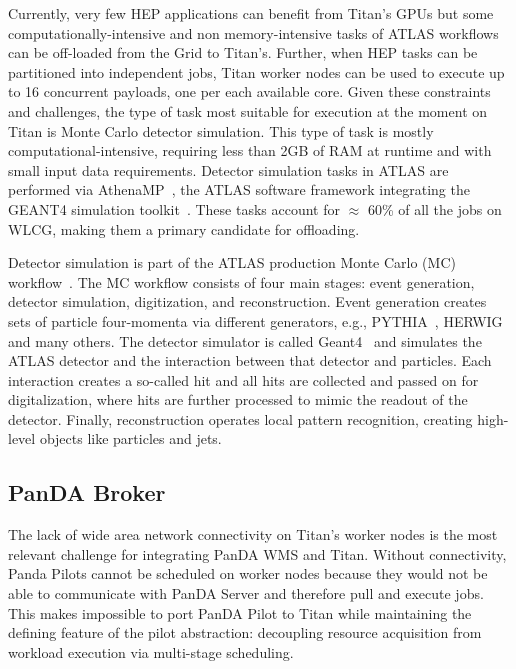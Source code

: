 Currently, very few HEP applications can benefit from Titan's GPUs but some
computationally-intensive and non memory-intensive tasks of ATLAS workflows
can be off-loaded from the Grid to Titan's. Further, when HEP tasks can be
partitioned into independent jobs, Titan worker nodes can be used to execute
up to 16 concurrent payloads, one per each available core. Given these
constraints and challenges, the type of task most suitable for execution at
the moment on Titan is Monte Carlo detector simulation. This type of task is
mostly computational-intensive, requiring less than 2GB of RAM at runtime and
with small input data requirements. Detector simulation tasks in ATLAS are
performed via AthenaMP~\cite{aad2010atlas}, the ATLAS software framework
integrating the GEANT4 simulation toolkit~\cite{agostinelli2003geant4}. These
tasks account for $\approx$ 60\% of all the jobs on WLCG, making them a
primary candidate for offloading.

Detector simulation is part of the ATLAS production Monte Carlo (MC)
workflow~\cite{rimoldi2006atlas,de2013delphes,ritsch2014atlas}. The MC
workflow consists of four main stages: event generation, detector simulation,
digitization, and reconstruction. Event generation creates sets of particle
four-momenta via different generators, e.g.,
PYTHIA~\cite{sjostrand2006pythia}, HERWIG~\cite{corcella2001herwig} and many
others. The detector simulator is called Geant4~\cite{agostinelli2003geant4}
and simulates the ATLAS detector and the interaction between that detector
and particles. Each interaction creates a so-called hit and all hits are
collected and passed on for digitalization, where hits are further processed
to mimic the readout of the detector. Finally, reconstruction operates local
pattern recognition, creating high-level objects like particles and jets.

\subsection{PanDA Broker}
\label{ssec:panda_titan}

The lack of wide area network connectivity on Titan's worker nodes is the
most relevant challenge for integrating PanDA WMS and Titan. Without
connectivity, Panda Pilots cannot be scheduled on worker nodes because they
would not be able to communicate with PanDA Server and therefore pull and
execute jobs. This makes impossible to port PanDA Pilot to Titan while
maintaining the defining feature of the pilot abstraction: decoupling
resource acquisition from workload execution via multi-stage scheduling.

